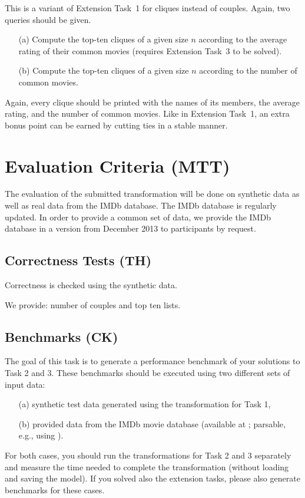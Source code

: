 \documentclass[a4paper,11pt]{article}
\begin{document}
This is a variant of Extension Task~1 for cliques instead of couples.  Again,
two queries should be given.

\begin{enumerate}
\item[(a)] Compute the top-ten cliques of a given size \(n\) according to the
  average rating of their common movies (requires Extension Task~3 to be
  solved).
\item[(b)] Compute the top-ten cliques of a given size \(n\) according to the
  number of common movies.
\end{enumerate}

Again, every clique should be printed with the names of its members, the
average rating, and the number of common movies.  Like in Extension Task~1, an
extra bonus point can be earned by cutting ties in a stable manner.


\section{Evaluation Criteria (MTT)}\label{sec-eval}

The evaluation of the submitted transformation will be done on
synthetic data as well as real data from the IMDb database. The IMDb
database is regularly updated. In order to provide a common set of
data, we provide the IMDb database in a version from December 2013 to
participants by request. 

\subsection{Correctness Tests (TH)}

Correctness is checked using the synthetic data.

We provide: number of couples and top ten lists.

\subsection{Benchmarks (CK)}

The goal of this task is to generate a performance benchmark
of your solutions to Task 2 and 3. These benchmarks should be
executed using two different sets of input data:
\begin{enumerate}
\item[(a)] synthetic test data generated using the transformation for Task 1, 
\item[(b)] provided data from the IMDb movie database (available at \cite{IMDBDATA}; parsable, e.g., using \cite{IMDB2EMF}).
\end{enumerate}
For both cases, you should run the transformations for Task 2 and 3
separately and measure the time needed to complete the transformation 
(without loading and saving the model).
If you solved also the extension tasks, please also generate benchmarks
for these cases.
\end{document}
